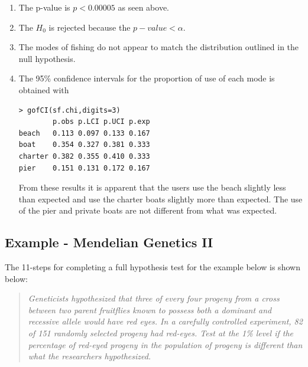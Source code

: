 \documentclass[10pt,openany]{book}\usepackage[]{graphicx}\usepackage[]{color}
\makeatletter
\newenvironment{kframe}{%
 \def\at@end@of@kframe{}%
 \ifinner\ifhmode%
  \def\at@end@of@kframe{\end{minipage}}%
  \begin{minipage}{\columnwidth}%
 \fi\fi%
 \def\FrameCommand##1{\hskip\@totalleftmargin \hskip-\fboxsep
 \colorbox{shadecolor}{##1}\hskip-\fboxsep
     \hskip-\linewidth \hskip-\@totalleftmargin \hskip\columnwidth}%
 \MakeFramed {\advance\hsize-\width
   \@totalleftmargin\z@ \linewidth\hsize
   \@setminipage}}%
 {\par\unskip\endMakeFramed%
 \at@end@of@kframe}
\newenvironment{knitrout}{}{} %
\makeatother
\begin{document}
\begin{enumerate}
  \item The p-value is $p<0.00005$ as seen above.
  \item The $H_{0}$ is rejected because the $p-value<\alpha$.
  \item The modes of fishing do not appear to match the distribution outlined in the null hypothesis.
  \item The 95\% confidence intervals for the proportion of use of each mode is obtained with
\begin{knitrout}
\color{fgcolor}\begin{kframe}
\begin{verbatim}
> gofCI(sf.chi,digits=3)
        p.obs p.LCI p.UCI p.exp
beach   0.113 0.097 0.133 0.167
boat    0.354 0.327 0.381 0.333
charter 0.382 0.355 0.410 0.333
pier    0.151 0.131 0.172 0.167
\end{verbatim}
\end{kframe}
\end{knitrout}
From these results it is apparent that the users use the beach slightly less than expected and use the charter boats slightly more than expected.  The use of the pier and private boats are not different from what was expected.
\end{enumerate}

\subsection{Example - Mendelian Genetics II}
The 11-steps  for completing a full hypothesis test for the example below is shown below:

\begin{quote}
\textsl{Geneticists hypothesized that three of every four progeny from a cross between two parent fruitflies known to possess both a dominant and recessive allele would have red eyes.  In a carefully controlled experiment, 82 of 151 randomly selected progeny had red-eyes.  Test at the 1\% level if the percentage of red-eyed progeny in the population of progeny is different than what the researchers hypothesized.}
\end{quote}
\end{document}
